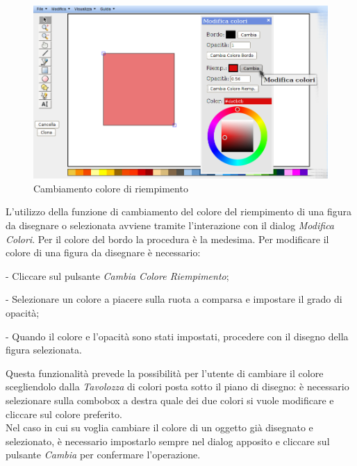  \begin{figure}[!ht]
\centering
\includegraphics[scale=0.5]{images/colore_riempimento.png}
\caption{Cambiamento colore di riempimento}
\end{figure}
 
 
 
\vspace{20pt}
L'utilizzo della funzione di cambiamento del colore del riempimento di una figura da disegnare o selezionata avviene tramite l'interazione con il dialog \textit{Modifica Colori}. Per il colore del bordo la procedura \` e la medesima.
Per modificare il colore di una figura da disegnare \` e necessario:
\begin{elencopuntato}[\subsubsecindent]
\item[-] Cliccare sul pulsante \textit{Cambia Colore Riempimento};
\item[-] Selezionare un colore a piacere sulla ruota a comparsa e impostare il grado di opacit\`a;
\item[-] Quando il colore e l'opacit\`a sono stati impostati, procedere con il disegno della figura selezionata.
\end{elencopuntato}

Questa funzionalit\`a prevede la possibilit\`a per l'utente di cambiare il colore scegliendolo dalla \textit{Tavolozza} di colori posta sotto il piano di disegno: \`e necessario selezionare sulla combobox a destra quale dei due colori si vuole modificare e cliccare sul colore preferito. \\
Nel caso in cui su voglia cambiare il colore di un oggetto gi\` a disegnato e selezionato, \`e necessario impostarlo sempre nel dialog apposito e cliccare sul pulsante \textit{Cambia} per confermare l'operazione.\\
 
